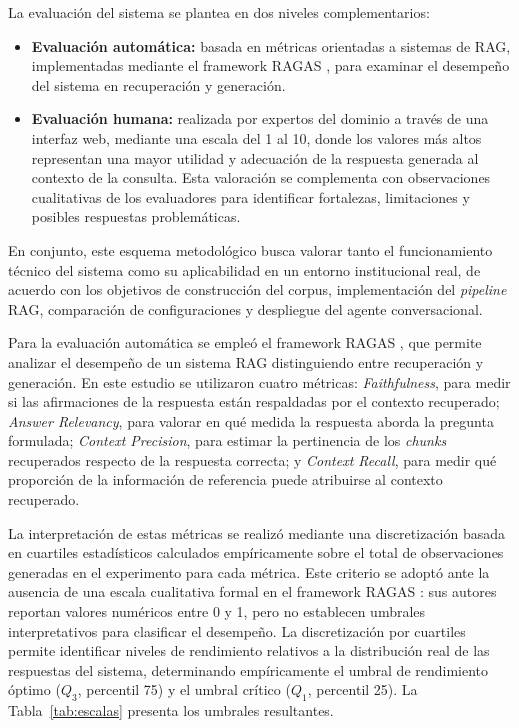 \documentclass{article}
\begin{document}
La evaluación del sistema se plantea en dos niveles complementarios:

\begin{itemize}

\item \textbf{Evaluación automática:} basada en métricas orientadas a sistemas de RAG, implementadas mediante el framework RAGAS \cite{es2024ragas}, para examinar el desempeño del sistema en recuperación y generación.

\item \textbf{Evaluación humana:} realizada por expertos del dominio a través de una interfaz web, mediante una escala del 1 al 10, donde los valores más altos representan una mayor utilidad y adecuación de la respuesta generada al contexto de la consulta. Esta valoración se complementa con observaciones cualitativas de los evaluadores para identificar fortalezas, limitaciones y posibles respuestas problemáticas.

\end{itemize}

En conjunto, este esquema metodológico busca valorar tanto el funcionamiento técnico del sistema como su aplicabilidad en un entorno institucional real, de acuerdo con los objetivos de construcción del corpus, implementación del \textit{pipeline} RAG, comparación de configuraciones y despliegue del agente conversacional.

Para la evaluación automática se empleó el framework RAGAS \cite{es2024ragas}, que permite analizar el desempeño de un sistema RAG distinguiendo entre recuperación y generación. En este estudio se utilizaron cuatro métricas: \textit{Faithfulness}, para medir si las afirmaciones de la respuesta están respaldadas por el contexto recuperado; \textit{Answer Relevancy}, para valorar en qué medida la respuesta aborda la pregunta formulada; \textit{Context Precision}, para estimar la pertinencia de los \textit{chunks} recuperados respecto de la respuesta correcta; y \textit{Context Recall}, para medir qué proporción de la información de referencia puede atribuirse al contexto recuperado.

La interpretación de estas métricas se realizó mediante una discretización basada en cuartiles estadísticos calculados empíricamente sobre el total de observaciones generadas en el experimento para cada métrica. Este criterio se adoptó ante la ausencia de una escala cualitativa formal en el framework RAGAS \cite{es2024ragas}: sus autores reportan valores numéricos entre 0 y 1, pero no establecen umbrales interpretativos para clasificar el desempeño. La discretización por cuartiles permite identificar niveles de rendimiento relativos a la distribución real de las respuestas del sistema, determinando empíricamente el umbral de rendimiento óptimo ($Q_3$, percentil 75) y el umbral crítico ($Q_1$, percentil 25). La Tabla~\ref{tab:escalas} presenta los umbrales resultantes.
\end{document}

